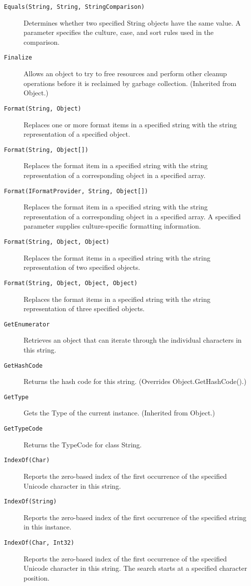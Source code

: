 \begin{description}
\item[\texttt{Equals(String, String, StringComparison)}] Determines whether two specified String objects have the same value. A parameter specifies the culture, case, and sort rules used in the comparison.
\item[\texttt{Finalize}] Allows an object to try to free resources and perform other cleanup operations before it is reclaimed by garbage collection. (Inherited from Object.)
\item[\texttt{Format(String, Object)}] Replaces one or more format items in a specified string with the string representation of a specified object.
\item[\texttt{Format(String, Object[])}] Replaces the format item in a specified string with the string representation of a corresponding object in a specified array.
\item[\texttt{Format(IFormatProvider, String, Object[])}] Replaces the format item in a specified string with the string representation of a corresponding object in a specified array. A specified parameter supplies culture-specific formatting information.
\item[\texttt{Format(String, Object, Object)}] Replaces the format items in a specified string with the string representation of two specified objects.
\item[\texttt{Format(String, Object, Object, Object)}] Replaces the format items in a specified string with the string representation of three specified objects.
\item[\texttt{GetEnumerator}] Retrieves an object that can iterate through the individual characters in this string.
\item[\texttt{GetHashCode}] Returns the hash code for this string. (Overrides Object.GetHashCode().)
\item[\texttt{GetType}] Gets the Type of the current instance. (Inherited from Object.)
\item[\texttt{GetTypeCode}] Returns the TypeCode for class String.
\item[\texttt{IndexOf(Char)}] Reports the zero-based index of the first occurrence of the specified Unicode character in this string.
\item[\texttt{IndexOf(String)}] Reports the zero-based index of the first occurrence of the specified string in this instance.
\item[\texttt{IndexOf(Char, Int32)}] Reports the zero-based index of the first occurrence of the specified Unicode character in this string. The search starts at a specified character position.

\end{description}

